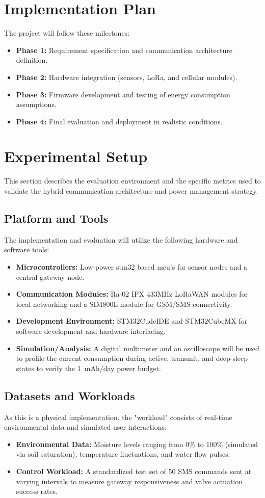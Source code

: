\documentclass[conference]{IEEEtran}
\begin{document}
\section{Implementation Plan}
The project will follow these milestones:
\begin{itemize}
    \item \textbf{Phase 1:} Requirement specification and communication architecture definition.
    \item \textbf{Phase 2:} Hardware integration (sensors, LoRa, and cellular modules).
    \item \textbf{Phase 3:} Firmware development and testing of energy consumption assumptions.
    \item \textbf{Phase 4:} Final evaluation and deployment in realistic conditions.
\end{itemize}
\section{Experimental Setup}

This section describes the evaluation environment and the specific metrics used to validate the hybrid communication architecture and power management strategy.

\subsection{Platform and Tools}
The implementation and evaluation will utilize the following hardware and software tools:
\begin{itemize}
    \item \textbf{Microcontrollers:} Low-power stm32 based mcu's for sensor nodes and a central gateway node.
    \item \textbf{Communication Modules:} Ra-02 IPX 433MHz LoRaWAN modules for local networking and a SIM800L module for GSM/SMS connectivity.
    \item \textbf{Development Environment:} STM32CudeIDE and STM32CubeMX for software development and hardware interfacing.
    \item \textbf{Simulation/Analysis:} A digital multimeter and an oscilloscope will be used to profile the current consumption during active, transmit, and deep-sleep states to verify the 1~mAh/day power budget.
\end{itemize}

\subsection{Datasets and Workloads}
As this is a physical implementation, the "workload" consists of real-time environmental data and simulated user interactions:
\begin{itemize}
    \item \textbf{Environmental Data:} Moisture levels ranging from 0\% to 100\% (simulated via soil saturation), temperature fluctuations, and water flow pulses.
    \item \textbf{Control Workload:} A standardized test set of 50 SMS commands sent at varying intervals to measure gateway responsiveness and valve actuation success rates.
\end{itemize}
\end{document}
